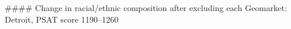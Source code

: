 #### Change in racial/ethnic composition after excluding each Geomarket: Detroit, PSAT score 1190–1260

